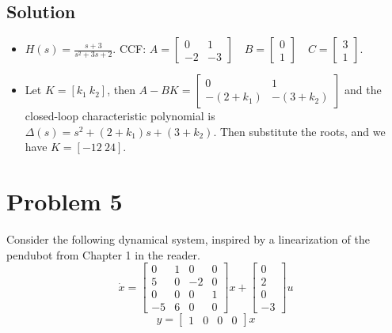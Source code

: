\documentclass[11pt]{report}
\begin{document}

\subsection*{Solution}
\begin{itemize}
\item $H(s) = \frac{s+3}{s^2+3s+2}$. CCF: $A = \begin{bmatrix} 0 & 1 \\-2 & -3 \end{bmatrix} \quad B = \begin{bmatrix} 0 \\ 1 \end{bmatrix} \quad C = \begin{bmatrix} 3 \\ 1 \end{bmatrix}$.
\item Let $K = [k_1 ~ k_2]$, then $A - B K = \begin{bmatrix} 0 & 1 \\-(2 + k_1) & -(3 + k_2) \end{bmatrix}$ and the closed-loop characteristic polynomial is $\Delta(s) = s^2 + (2 + k_1)s + (3 + k_2)$. Then substitute the roots, and we have $K = [-12 ~ 24]$.
\end{itemize}


\pagebreak
\section*{Problem 5}

Consider the following dynamical system, inspired by a linearization of the pendubot from Chapter 1 in the reader.
\[
\dot x =
\begin{bmatrix}
0 & 1 & 0 & 0 \\
5 & 0 & -2 & 0 \\
0 & 0 & 0 & 1 \\
-5 & 6 & 0 & 0
\end{bmatrix}
x +
\begin{bmatrix}
0 \\
2 \\
0 \\
-3
\end{bmatrix}
u
\]
\[
y =
\begin{bmatrix}
1 & 0 & 0 & 0
\end{bmatrix}
x
\]
\end{document}
